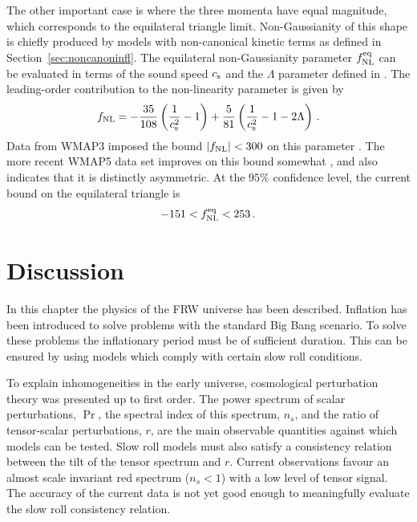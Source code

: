 The other important case is   
where the three momenta have equal magnitude, which corresponds to the
equilateral triangle limit. Non-Gaussianity of this shape is chiefly produced
by models with non-canonical kinetic terms as defined in
Section~\ref{sec:noncanoninfl}. The equilateral non-Gaussianity parameter
$f_{\mathrm{NL}}^{\mathrm{eq}}$ can be evaluated in terms of the sound speed $c_\mathrm{s}$ and the
$\Lambda$ parameter defined in .
The leading-order contribution to the
non-linearity 
parameter is given by \cite{chenetal,lidser3}
% 
\begin{equation} 
\label{eq:fnldefn-dbiintro}
 f_{\mathrm{NL}} = -\frac{35}{108}\left(\frac{1}{c_\mathrm{s}^2} -1 \right) +
\frac{5}{81}\left( \frac{1}{c_\mathrm{s}^2} -1 -2\Lambda \right) \,.
\end{equation}
%  
Data from WMAP3 imposed the bound $|f_{\mathrm{NL}}| < 300$ on this parameter
\cite{spergel}. The more recent WMAP5 data set
improves on this bound somewhat \cite{Komatsu:2008hk}, and
also indicates that it is distinctly asymmetric. At the $95 \%$ confidence
level, the current bound on the 
equilateral triangle is 
% 
\begin{equation}
\label{eq:fnleq-wmap5-intro}
 -151<f_{\mathrm{NL}}^{\mathrm{eq}}<253\,.
\end{equation}
% 


\section{Discussion}
\label{sec:disc-intro}

In this chapter the physics of the FRW universe has been described. Inflation has been introduced
to solve problems with the standard Big Bang scenario. To solve these problems the
inflationary
period must be of sufficient duration. This can be ensured by using models which comply with
certain slow roll conditions. 

To explain inhomogeneities in the early universe, cosmological perturbation theory
was presented up
to first order. The power spectrum of scalar perturbations, $\Pr$, the spectral index of this
spectrum, $n_s$, and the ratio of tensor-scalar perturbations, $r$, are the main
observable
quantities against which models can be tested. Slow roll models must also satisfy a
consistency
relation between the tilt of the tensor spectrum and $r$. Current observations favour an almost
scale invariant red spectrum ($n_s<1$) with a low level of tensor signal. The accuracy of the
current data is not yet good enough to meaningfully evaluate the slow roll consistency relation. 

